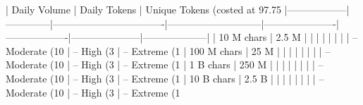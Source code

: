 | Daily Volume     | Daily Tokens | Unique Tokens (costed at 97.75%
|------------------|--------------|----------------------------------|-----------------------------|----------------------|-------------------|---------------------|--------------------|
| 10 M chars   | 2.5 M        |                                  |                             |                      |                   |                     |                    |
| – Moderate (10%
| – High (3%
| – Extreme (1%
| 100 M chars  | 25 M         |                                  |                             |                      |                   |                     |                    |
| – Moderate (10%
| – High (3%
| – Extreme (1%
| 1 B chars    | 250 M        |                                  |                             |                      |                   |                     |                    |
| – Moderate (10%
| – High (3%
| – Extreme (1%
| 10 B chars   | 2.5 B        |                                  |                             |                      |                   |                     |                    |
| – Moderate (10%
| – High (3%
| – Extreme (1%

